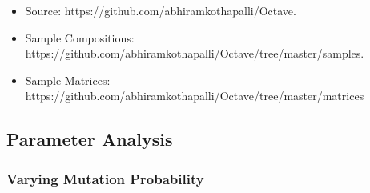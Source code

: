 \documentclass{article}
\begin{document}
\begin{itemize}
\item Source: https://github.com/abhiramkothapalli/Octave.
\item Sample Compositions: https://github.com/abhiramkothapalli/Octave/tree/master/samples.
\item Sample Matrices: https://github.com/abhiramkothapalli/Octave/tree/master/matrices
\end{itemize}

\subsection{Parameter Analysis}

\subsubsection{Varying Mutation Probability}
\end{document}
